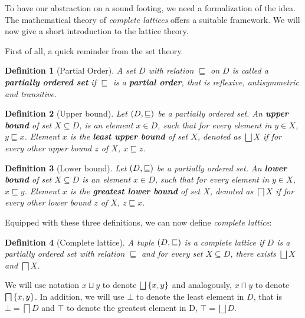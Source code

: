 \documentclass[..thesis.tex]{subfiles}
\newtheorem{defin}{Definition}[section]
\begin{document}

To have our abstraction on a sound footing, we need a formalization of the idea.
The mathematical theory of \textit{complete lattices} offers a suitable framework.
We will now give a short introduction to the lattice theory.


First of all, a quick reminder from the set theory.

\begin{defin}[Partial Order]
A set $D$ with relation $\sqsubseteq$ on $D$ is called a \textbf{partially ordered set} if $\sqsubseteq$ 
is a \textbf{partial order}, that is reflexive, antisymmetric and transitive.
\end{defin}

\begin{defin}[Upper bound]
Let $\left( D, \sqsubseteq \right)$ be a partially ordered set. An \textbf{upper bound} of set $X \subseteq D$,  is an element $x \in D$,
such that for every element in $y \in X$, $y \sqsubseteq x$. Element $x$ is the \textbf{least upper bound} of set $X$,
denoted as $\bigsqcup X$ if for every other upper bound $z$ of $X$, $x \sqsubseteq z$.  
\end{defin}

\begin{defin}[Lower bound]
Let $\left( D, \sqsubseteq \right)$ be a partially ordered set. An \textbf{lower bound} of set $X \subseteq D$  is an element $x \in D$,
such that for every element in $y \in X$, $x \sqsubseteq y$. Element $x$ is the \textbf{greatest lower bound} of set $X$,
denoted as $\bigsqcap X$ if for every other lower bound $z$ of $X$, $z \sqsubseteq x$.    
\end{defin}

Equipped with these three definitions, we can now define \textit{complete lattice}:

\begin{defin}[Complete lattice]
A tuple $\left( D, \sqsubseteq \right)$ is a complete lattice if $D$ is a partially ordered set with relation $\sqsubseteq$ and for every set $X \subseteq D$,
there exists $\bigsqcup X$ and $\bigsqcap X$.
\end{defin}


We will use notation $x \sqcup  y$ to denote $\bigsqcup \left\lbrace x, y \right\rbrace$ and analogously, $x \sqcap y $ to denote $\bigsqcap \lb x, y \rb$.
In addition, we will use $\bot$ to denote the least element in $D$, that is $\bot = \bigsqcap D$ and $\top$ to denote the greatest element in D, $\top = \bigsqcup D$.
\end{document}
